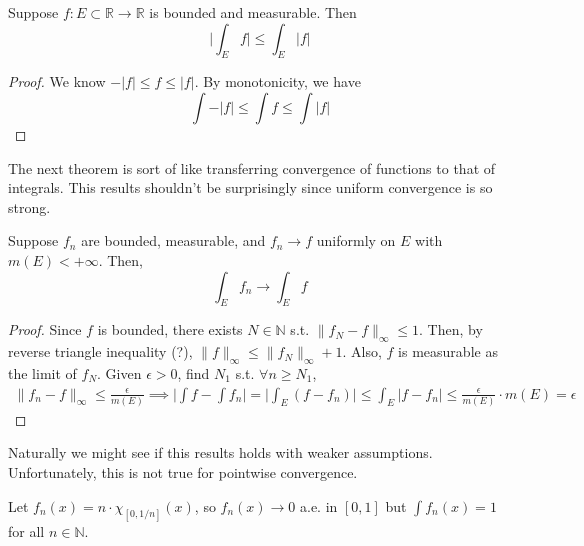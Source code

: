   \begin{corollary}[]
    Suppose $f: E \subset \mathbb{R} \to \mathbb{R}$ is bounded and measurable. Then 
    \begin{equation}
      \bigg| \int_E f \bigg| \leq \int_E |f| 
    \end{equation}
  \end{corollary} 
  \begin{proof}
    We know $-|f| \leq f \leq |f|$. By monotonicity, we have 
    \begin{equation}
      \int -|f| \leq \int f \leq \int |f|
    \end{equation}
  \end{proof} 

  The next theorem is sort of like transferring convergence of functions to that of integrals. This results shouldn't be surprisingly since uniform convergence is so strong.  

  \begin{theorem}
    Suppose $f_n$ are bounded, measurable, and $f_n \to f$ uniformly on $E$ with $m(E) < +\infty$. Then, 
    \begin{equation}
      \int_E f_n \to \int_E f
    \end{equation}
  \end{theorem} 
  \begin{proof} 
    Since $f$ is bounded, there exists $N \in \mathbb{N}$ s.t. $\| f_N - f \|_{\infty} \leq 1$. Then, by reverse triangle inequality (?), $\|f\|_\infty \leq \|f_N\|_\infty + 1$. Also, $f$ is measurable as the limit of $f_N$. Given $\epsilon > 0$, find $N_1$ s.t. $\forall n \geq N_1$, 
    \begin{align}
      \|f_n - f\|_\infty \leq \frac{\epsilon}{m(E)} \implies  \bigg| \int f - \int f_n \bigg| = \bigg| \int_E (f - f_n) \bigg| \leq \int_E |f - f_n| \leq \frac{\epsilon}{m(E)} \cdot m(E) = \epsilon
    \end{align}
  \end{proof}

  Naturally we might see if this results holds with weaker assumptions. Unfortunately, this is not true for pointwise convergence. 

  \begin{example}
    Let $f_n (x) = n \cdot \chi_{[0, 1/n]} (x)$, so $f_n (x) \to 0$ a.e. in $[0, 1]$ but $\int f_n (x) = 1$ for all $n \in \mathbb{N}$. 
  \end{example}

